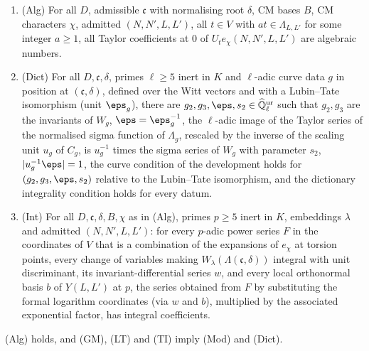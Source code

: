 \begin{definition}\label{pf:reckernel:def-three}
\begin{enumerate}
\item \textup{(Alg)} For all $D$, admissible $\mathfrak c$ with normalising root $\delta$, CM bases $B$, CM characters
  $\chi$, admitted $(N,N',L,L')$, all $t\in V$ with $at\in\Lambda_{L,L'}$ for some integer $a\ge1$, all Taylor
  coefficients at $0$ of $U_te_\chi(N,N',L,L')$ are algebraic numbers.
\item \textup{(Dict)} For all $D,\mathfrak c,\delta$, primes $\ell\ge5$ inert in $K$ and $\ell$-adic curve data $g$ in
  position at $(\mathfrak c,\delta)$, defined over the Witt vectors and with a Lubin--Tate isomorphism (unit
  $\eps_g$), there are $g_2,g_3,\eps,s_2\in\reckKur$ such that $g_2,g_3$ are the invariants of $W_g$,
  $\eps=\eps_g^{-1}$, the $\ell$-adic image of the Taylor series of the normalised sigma function of $\Lambda_g$,
  rescaled by the inverse of the scaling unit $u_g$ of $C_g$, is $u_g^{-1}$ times the sigma series of $W_g$ with
  parameter $s_2$, $|u_g^{-1}\eps|=1$, the curve condition of the development holds for $(g_2,g_3,\eps,s_2)$
  relative to the Lubin--Tate isomorphism, and the dictionary integrality condition holds for every datum.
\item \textup{(Int)} For all $D,\mathfrak c,\delta,B,\chi$ as in (Alg), primes $p\ge5$ inert in $K$, embeddings
  $\lambda$ and admitted $(N,N',L,L')$: for every $p$-adic power series $F$ in the coordinates of $V$ that is a
  combination of the expansions of $e_\chi$ at torsion points, every change of variables making
  $W_\lambda(\Lambda(\mathfrak c,\delta))$ integral with unit discriminant, its invariant-differential series $w$, and
  every local orthonormal basis $b$ of $Y(L,L')$ at $p$, the series obtained from $F$ by substituting the formal
  logarithm coordinates (via $w$ and $b$), multiplied by the associated exponential factor, has integral
  coefficients.
\end{enumerate}
\end{definition}

\begin{theorem}\label{pf:reckernel:threeFromCM}
\textup{(Alg)} holds, and \textup{(GM)}, \textup{(LT)} and \textup{(TI)} imply \textup{(Mod)} and \textup{(Dict)}.
\end{theorem}

